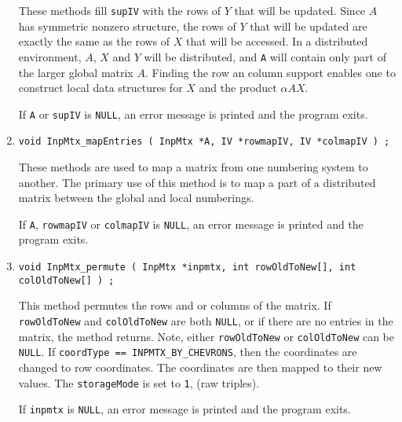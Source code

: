 \begin{enumerate}
These methods fill {\tt supIV} with 
the rows of $Y$ that will be updated. 
Since $A$ has symmetric nonzero structure, 
the rows of $Y$ that will be updated are exactly the same as 
the rows of $X$ that will be accessed.
In a distributed environment, $A$, $X$ and $Y$ will be distributed,
and {\tt A} will contain only part of the larger global matrix $A$.
Finding the row an column support enables one to construct local
data structures for $X$ and the product $\alpha A X$.
\par {}
If {\tt A} or {\tt supIV} is {\tt NULL},
an error message is printed and the program exits.
\item
\begin{verbatim}
void InpMtx_mapEntries ( InpMtx *A, IV *rowmapIV, IV *colmapIV ) ;
\end{verbatim}
These methods are used to map a matrix from one numbering system
to another.
The primary use of this method is to map a part of a distributed
matrix between the global and local numberings.
\par {}
If {\tt A}, {\tt rowmapIV} or {\tt colmapIV} is {\tt NULL},
an error message is printed and the program exits.
\item
\begin{verbatim}
void InpMtx_permute ( InpMtx *inpmtx, int rowOldToNew[], int colOldToNew[] ) ;
\end{verbatim}
This method permutes the rows and or columns of the matrix.
If {\tt rowOldToNew} and {\tt colOldToNew} are both {\tt NULL}, or
if there are no entries in the matrix, the method returns.
Note, either {\tt rowOldToNew} or {\tt colOldToNew} can be {\tt NULL}.
If {\tt coordType == INPMTX\_BY\_CHEVRONS}, then the coordinates
are changed to row coordinates.
The coordinates are then mapped to their new values.
The {\tt storageMode} is set to {\tt 1}, (raw triples).
\par {}
If {\tt inpmtx} is {\tt NULL},
an error message is printed and the program exits.
\end{enumerate}
\par
